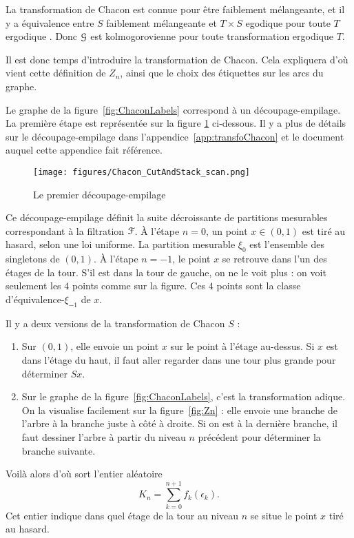 \documentclass[12pt,a4paper]{article}
\begin{document}
La transformation de Chacon est connue pour être faiblement mélangeante,  
et il y a équivalence entre \og $S$ faiblement mélangeante \fg{} et 
\og $T\times S$ egodique pour toute $T$ ergodique \fg. 
Donc $\EuScript{G}$ est kolmogorovienne pour toute transformation ergodique $T$. 

{\scriptsize %
Il est donc temps d'introduire la transformation de Chacon. 
Cela expliquera d'où vient cette définition de $Z_n$, ainsi que le choix 
des étiquettes sur les arcs du graphe. 

Le graphe de la figure~\ref{fig:ChaconLabels} correspond à un découpage-empilage. 
La première étape est représentée sur la figure \ref{fig:scan} ci-dessous.
Il y a plus de détails sur le découpage-empilage dans l'appendice~\ref{app:transfoChacon} et 
le document auquel cette appendice fait référence.

\begin{figure}[!h]
\centering
	\texttt{[image: figures/Chacon\_CutAndStack\_scan.png]}
\caption{Le premier découpage-empilage}\label{fig:scan}
\end{figure}

Ce découpage-empilage définit la suite décroissante de partitions mesurables 
correspondant à la filtration $\EuScript{F}$. 
À l'étape $n=0$, un point $x \in (0,1)$ est tiré au hasard, selon une loi uniforme. 
La partition mesurable $\xi_0$ est l'ensemble des singletons de $(0,1)$. 
À l'étape $n=-1$, le point $x$ se retrouve dans l'un des étages de la tour. 
S'il est dans la tour de gauche, on ne le voit plus : on voit 
seulement les $4$ points comme sur la figure. Ces $4$ points sont la classe 
d'équivalence-$\xi_{-1}$ de $x$.  

Il y a deux versions de la transformation de Chacon $S$ :
\begin{enumerate}
\item Sur $(0,1)$, elle envoie un point $x$ sur le point à l'étage au-dessus. 
Si $x$ est dans l'étage du haut, il faut aller regarder dans une tour plus grande 
pour déterminer $Sx$. 

\item Sur le graphe de la  figure~\ref{fig:ChaconLabels}, c'est la transformation adique. 
On la visualise facilement sur la figure~\ref{fig:Zn} : elle envoie une branche 
de l'arbre à la branche juste à côté à droite. Si on est à la dernière branche, 
il faut dessiner l'arbre à partir du niveau $n$ précédent pour déterminer la 
branche suivante. 
\end{enumerate}

Voilà alors d'où sort l'entier aléatoire 
$$
K_n=\sum_{k=0}^{n+1}f_k(\epsilon_k).
$$
Cet entier indique dans quel étage de la tour au niveau $n$ se situe 
le point $x$ tiré au hasard. 
}
\end{document}
